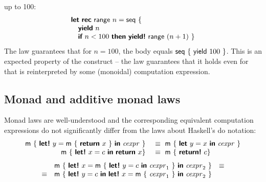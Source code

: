 \documentclass[runningheads,a4paper]{llncs}
\begin{document}
up to 100:
%
\begin{equation*}
\begin{array}{l}
\kvd{let}~\kvd{rec}~\ident{range}~n = \ident{seq}~\{~ \\
\quad\kvd{yield}~n\\
\quad\kvd{if}~n < 100~\kvd{then}~\kvd{yield!}~\ident{range}~(n + 1)~\}
\end{array}
\end{equation*}
%
The law guarantees that for $n=100$, the body equals $\textnormal{\sffamily seq}~\{~\textnormal{\sffamily yield}~100~\}$.
This is an expected property of the  construct -- the law guarantees that it holds even 
for  that is reinterpreted by some (monoidal) computation expression.


\subsection{Monad and additive monad laws}
\label{sec:laws-monads}

Monad laws are well-understood and the corresponding equivalent computation expressions do
not significantly differ from the laws about Haskell's do notation:
%
\begin{equation*}
\begin{array}{rl}
\ident{m}~\{~ \kvd{let!}~y=\ident{m}~\{~\kvd{return}~x~\}~\kvd{in}~\cexpr~ \}
&~\equiv~ \ident{m}~\{~ \kvd{let}~y=x~\kvd{in}~\cexpr~ \}
\\
\ident{m}~\{~ \kvd{let!}~x=c~\kvd{in}~\kvd{return}~x \}
&~\equiv~ \ident{m}~\{~ \kvd{return!}~c \}
\end{array}
\end{equation*}
\begin{equation*}
\begin{array}{rcl}
      &\ident{m}~\{~ \kvd{let!}~x=\ident{m}~\{~\kvd{let!}~y=c~\kvd{in}~\cexpr_1~\}~\kvd{in}~\cexpr_2~\}&\equiv\\
\equiv&\ident{m}~\{~ \kvd{let!}~y=c~\kvd{in}~\kvd{let!}~x=\ident{m}~\{~\cexpr_1~\}~\kvd{in}~\cexpr_2~\}\\
\end{array}
\end{equation*}

\vspace{-1em}
\end{document}
